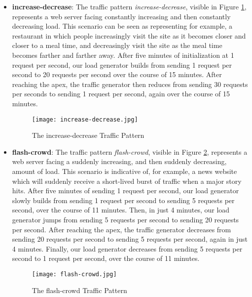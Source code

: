 \begin{itemize}
  \item \textbf{increase-decrease}: The traffic pattern
    \textit{increase-decrease}, visible in Figure \ref{fig:increase-decrease},
    represents a web server facing constantly increasing and then constantly
    decreasing load. This scenario can be seen as representing for example, a
    restaurant in which people increasingly visit the site as it becomes closer
    and closer to a meal time, and decreasingly visit the site as the meal time
    becomes farther and farther away. After five minutes of initialization at
    1 request per second, our load
    generator builds from sending 1 request per second to 20 requests per
    second over the course of 15 minutes. After reaching the apex, the traffic
    generator then reduces from sending 30 requests per seconds to sending 1
    request per second, again over the course of 15 minutes.

    \begin{figure}[!h]
      \centerline{\texttt{[image: increase-decrease.jpg]}}
      \caption{The increase-decrease Traffic Pattern}
      \label{fig:increase-decrease}
    \end{figure}

  \item \textbf{flash-crowd}: The traffic pattern \textit{flash-crowd}, visible
    in Figure \ref{fig:flash-crowd}, represents a web server facing a suddenly
    increasing, and then suddenly decreasing, amount of load. This scenario is
    indicative of, for example, a news website which will suddenly receive a
    short-lived burst of traffic when a major story hits. After five minutes of
    sending 1 request per second, our load generator
    slowly builds from sending 1 request per second
    to sending 5 requests per second, over the course of 11 minutes. Then, in
    just 4 minutes, our load generator jumps from sending 5 requests per second
    to sending 20 requests per second. After reaching the apex, the traffic
    generator decreases from sending 20 requests per second to sending 5
    requests per second, again in just 4 minutes. Finally, our load generator
    decreases from sending 5 requests per second to 1 request per second, over
    the course of 11 minutes.

    \begin{figure}[!h]
      \centerline{\texttt{[image: flash-crowd.jpg]}}
      \caption{The flash-crowd Traffic Pattern}
      \label{fig:flash-crowd}
    \end{figure}

\end{itemize}
